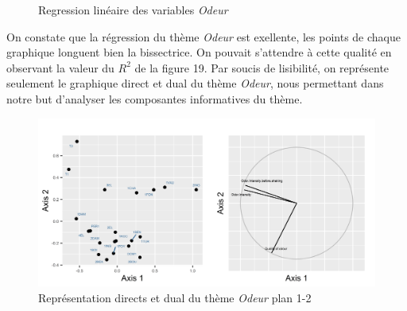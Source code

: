 \documentclass[a4paper,french,10pt]{article}
\begin{document}
\begin{figure}[htp]
{	}%
	\hfill%
	\caption{Regression linéaire des variables \textit{Odeur}}
\end{figure}

\newpage

On constate que la régression du thème \textit{Odeur} est exellente, les points de chaque graphique longuent bien la bissectrice. On pouvait s'attendre à cette qualité en observant la valeur du $R^2$ de la figure 19. \newline 
Par soucis de lisibilité, on représente seulement le graphique direct et dual du thème \textit{Odeur}, nous permettant dans notre but d'analyser les composantes informatives du thème. 

\begin{figure}[htp] 
	\centering
	\includegraphics[scale=0.8]{images/Plot.IndVar_Cross_B1_1.2.png}
	\caption{Représentation directs et dual du thème \textit{Odeur} plan 1-2}
\end{figure}
\end{document}
